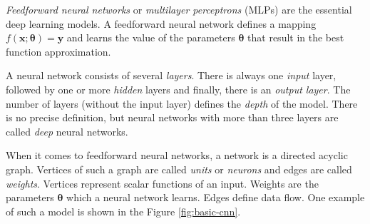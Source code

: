 \textit{Feedforward neural networks} or \textit{multilayer perceptrons} (MLPs) are the essential deep learning models. A feedforward neural network defines a mapping $f (\pmb{x} ; \pmb{\theta}) = \pmb{y}$ and learns the value of the parameters $\pmb{\theta}$ that result in the best function approximation.

A neural network consists of several \textit{layers}. There is always one \textit{input} layer, followed by one or more \textit{hidden} layers and finally, there is an \textit{output layer}. The number of layers (without the input layer) defines the \textit{depth} of the model. There is no precise definition, but neural networks with more than three layers are called \textit{deep} neural networks. 

When it comes to feedforward neural networks, a network is a directed acyclic graph. Vertices of such a graph are called \textit{units} or \textit{neurons} and edges are called \textit{weights}. Vertices represent scalar functions of an input. Weights are the parameters $\pmb \theta$ which a neural network learns. Edges define data flow. One example of such a model is shown in the Figure \ref{fig:basic-cnn}.


